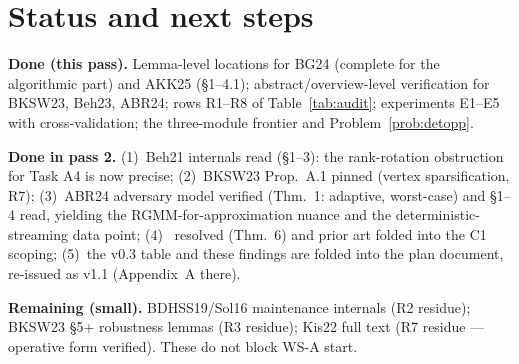 \documentclass[11pt]{article}
\begin{document}
\section{Status and next steps}\label{sec:next}

\textbf{Done (this pass).} Lemma-level locations for BG24 (complete for the
algorithmic part) and AKK25 (\S1--4.1); abstract/overview-level verification
for BKSW23, Beh23, ABR24; rows R1--R8 of Table~\ref{tab:audit}; experiments
E1--E5 with cross-validation; the three-module frontier and
Problem~\ref{prob:detopp}.

\textbf{Done in pass 2.} (1)~Beh21 internals read (\S1--3): the
rank-rotation obstruction for Task A4 is now precise; (2)~BKSW23
Prop.~A.1 pinned (vertex sparsification, R7); (3)~ABR24 adversary model
verified (Thm.~1: adaptive, worst-case) and \S1--4 read, yielding the
RGMM-for-approximation nuance and the deterministic-streaming data point;
(4)~\cite{ACK19} resolved (Thm.~6) and \cite{AS19} prior art folded into
the C1 scoping; (5)~the v0.3 table and these findings are folded into the
plan document, re-issued as v1.1 (Appendix~A there).

\textbf{Remaining (small).} BDHSS19/Sol16 maintenance internals (R2
residue); BKSW23 \S5+ robustness lemmas (R3 residue); Kis22 full text
(R7 residue --- operative form verified). These do not block WS-A start.
\end{document}

